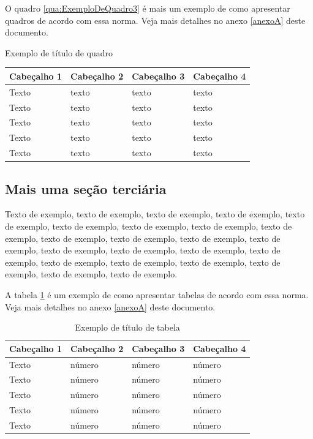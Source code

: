 \documentclass[
	12pt,				%
	oneside,			%
	a4paper,			%
	english,			%
	brazil				%
	]{abntex2ppgsi}
\begin{document}
O quadro \ref{qua:ExemploDeQuadro3} é mais um exemplo de como apresentar quadros de acordo com essa norma. Veja mais detalhes no anexo \ref{anexoA} deste documento.

\begin{quadro}[H]
	\centering
	\caption{Exemplo de título de quadro}
	\begin{tabular}{|p{1in} | p{1in} | p{1in} | p{1in} |} \hline
		
		Cabeçalho 1	& Cabeçalho 2	& Cabeçalho 3	& Cabeçalho 4 \\ \hline
		Texto	& texto & texto	& texto \\ \hline
		Texto	& texto & texto	& texto \\ \hline
		Texto	& texto & texto	& texto \\ \hline
		Texto	& texto & texto	& texto \\ \hline
		Texto	& texto & texto	& texto \\ \hline
		
	\end{tabular}
	\label{qua:ExemploDeQuadro3}
\end{quadro}

\subsection{Mais uma seção terciária}

Texto de exemplo, texto de exemplo, texto de exemplo, texto de exemplo, texto de exemplo, texto de exemplo, texto de exemplo, texto de exemplo, texto de exemplo, texto de exemplo, texto de exemplo, texto de exemplo, texto de exemplo, texto de exemplo, texto de exemplo, texto de exemplo, texto de exemplo, texto de exemplo, texto de exemplo, texto de exemplo, texto de exemplo, texto de exemplo, texto de exemplo.

A tabela \ref{tab:ExemploDeTabela3} é um exemplo de como apresentar tabelas de acordo com essa norma. Veja mais detalhes no anexo \ref{anexoA} deste documento.

\begin{table}[htbp]
	\centering
	\caption{Exemplo de título de tabela}
		\begin{tabular}{p{0.85in} p{0.85in} p{0.85in} p{0.85in} } \hline
		
		Cabeçalho 1	& Cabeçalho 2	& Cabeçalho 3	& Cabeçalho 4 \\ \hline
		Texto	& número & número	& número \\ 
		Texto	& número & número	& número \\ 
		Texto	& número & número	& número \\ 
		Texto	& número & número	& número \\ 
		Texto	& número & número	& número \\ \hline
			
		\end{tabular}
	\label{tab:ExemploDeTabela3}
\end{table}
\end{document}
